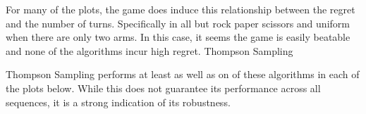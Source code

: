 \documentclass[10pt,a4paper]{article} %
\begin{document}
	For many of the plots, the game does induce this relationship between the regret and the number of turns.  Specifically in all but rock paper scissors and uniform when there are only two arms.  In this case, it seems the game is easily beatable and none of the algorithms incur high regret.  Thompson Sampling 
	
	Thompson Sampling performs at least as well as on of these algorithms in each of the plots below.  While this does not guarantee its performance across all sequences, it is a strong indication of its robustness.

	\begin{figure}[h!]


\end{figure}
\end{document}
